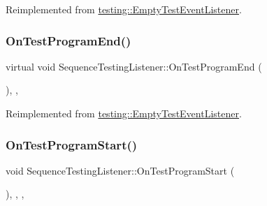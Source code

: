 Reimplemented from \mbox{\hyperlink{classtesting_1_1_empty_test_event_listener_aaa9d683e8e0c850af67a0b92d785ddb9}{testing\+::\+Empty\+Test\+Event\+Listener}}.

\mbox{\label{class_sequence_testing_listener_aacac5e15bac089460841ff63a5c31f57}} 
\subsubsection{\texorpdfstring{OnTestProgramEnd()}{OnTestProgramEnd()}\hspace{0.1cm}{\footnotesize\ttfamily [3/3]}}
{\footnotesize\ttfamily virtual void Sequence\+Testing\+Listener\+::\+On\+Test\+Program\+End (\begin{DoxyParamCaption}\item[{const \mbox{\hyperlink{classtesting_1_1_unit_test}{Unit\+Test}} \&}]{ }\end{DoxyParamCaption})\hspace{0.3cm}{\ttfamily [inline]}, {\ttfamily [protected]}, {\ttfamily [virtual]}}



Reimplemented from \mbox{\hyperlink{classtesting_1_1_empty_test_event_listener_aaa9d683e8e0c850af67a0b92d785ddb9}{testing\+::\+Empty\+Test\+Event\+Listener}}.

\mbox{\label{class_sequence_testing_listener_a2dcf940322a480b210d8e5e934dd0a79}} 
\subsubsection{\texorpdfstring{OnTestProgramStart()}{OnTestProgramStart()}\hspace{0.1cm}{\footnotesize\ttfamily [1/3]}}
{\footnotesize\ttfamily void Sequence\+Testing\+Listener\+::\+On\+Test\+Program\+Start (\begin{DoxyParamCaption}\item[{const \mbox{\hyperlink{classtesting_1_1_unit_test}{Unit\+Test}} \&}]{ }\end{DoxyParamCaption})\hspace{0.3cm}{\ttfamily [inline]}, {\ttfamily [override]}, {\ttfamily [protected]}, {\ttfamily [virtual]}}



